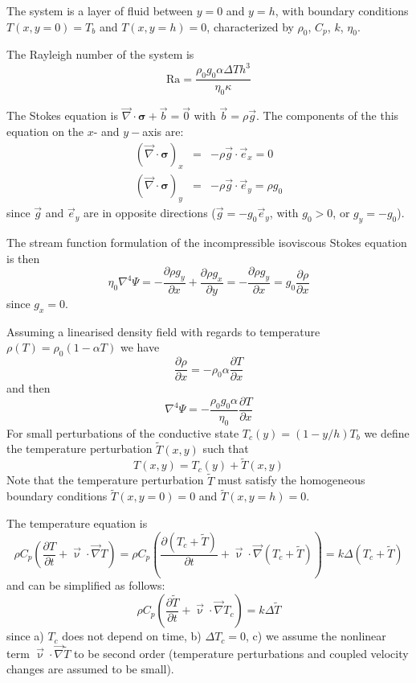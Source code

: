 

The system is a layer of fluid between $y=0$ and $y=h$, with boundary conditions $T(x,y=0)=T_b$ 
and $T(x,y=h)=0$, characterized by $\rho_0$, $C_p$, $k$, $\eta_0$. 

The Rayleigh number of the system is 
\[
\text{Ra}= \frac{\rho_0 g_0 \alpha \Delta T h^3}{\eta_0 \kappa}
\]

The Stokes equation is $\vec \nabla \cdot \bm \sigma + \vec b = \vec 0$ with $\vec b=\rho \vec g$. 
The components of the this equation on the $x$- and $y-$axis are:
\begin{eqnarray}
(\vec \nabla \cdot \bm \sigma)_x &=& - \rho \vec g \cdot \vec e_x = 0\\ 
(\vec \nabla \cdot \bm \sigma)_y &=& - \rho \vec g \cdot \vec e_y = \rho g_0
\end{eqnarray}
since $\vec g$ and $\vec e_y$ are in opposite directions ($\vec g = - g_0 \vec e_y$, with $g_0>0$, 
or $g_y=-g_0$).

The stream function formulation of the incompressible isoviscous Stokes equation is then
\[
\eta_0 \nabla^4 \Psi
= -\frac{\partial \rho g_y}{\partial x} + \frac{\partial \rho g_x}{\partial y}   
= -\frac{\partial \rho g_y}{\partial x} 
=  g_0 \frac{\partial \rho}{\partial x} 
\]
since $g_x=0$. 

Assuming a linearised density field with regards to temperature $\rho(T)=\rho_0 (1-\alpha T)$
we have 
\[
\frac{\partial \rho}{\partial x} 
=
-\rho_0 \alpha \frac{\partial T}{\partial x} 
\]
and then 
\begin{equation}
\boxed{
\nabla^4 \Psi= -\frac{\rho_0 g_0 \alpha}{\eta_0} \frac{\partial T}{\partial x} 
}
\end{equation}
For small perturbations of the conductive state $T_c(y)=(1-y/h)T_b$ 
we define the temperature perturbation $\tilde{T}(x,y)$ such that 
\[
T(x,y)=T_c(y)+\tilde{T}(x,y)
\]
Note that the temperature perturbation $\tilde{T}$ must satisfy the homogeneous boundary 
conditions $\tilde{T}(x,y=0)=0$ and $\tilde{T}(x,y=h)=0$.

The temperature equation is
\[
\rho C_p \left( \frac{\partial T}{\partial t} + {\vec \upnu}\cdot {\vec \nabla} T \right) 
=\rho C_p \left( \frac{\partial (T_c+\tilde{T})}{\partial t} + {\vec \upnu}\cdot {\vec \nabla} 
(T_c+\tilde{T}) \right) 
= k \Delta (T_c+\tilde{T})
\]
and can be simplified as follows:
\[
\rho C_p \left( \frac{\partial \tilde{T}}{\partial t} + {\vec \upnu}\cdot {\vec \nabla} T_c \right) 
= k \Delta \tilde{T}
\]
since a) $T_c$ does not depend on time, b) $\Delta T_c=0$, c) we assume the nonlinear 
term ${\vec \upnu}\cdot {\vec \nabla} \tilde{T} $ to be second order (temperature perturbations and 
coupled velocity changes are assumed to be small).

